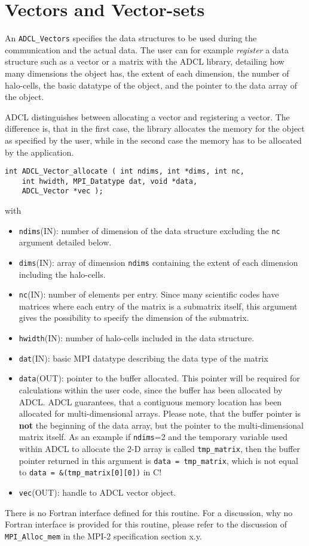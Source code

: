 \section{Vectors and Vector-sets}

An {\tt ADCL\_Vectors} specifies the data structures to be used during the communication and the actual data. The user can for example {\it register} a data structure such as a vector or a matrix with the ADCL library, detailing how many dimensions the object has, the extent of each dimension, the number of halo-cells, the basic datatype of the object, and the pointer to the data array of the object.

ADCL distinguishes between allocating a vector and registering a vector. The difference is, that in the first case, the library allocates the memory for the object as specified by the user, while in the second case the memory has to be allocated by the application. 

\begin{verbatim}
int ADCL_Vector_allocate ( int ndims, int *dims, int nc, 
    int hwidth, MPI_Datatype dat, void *data, 
    ADCL_Vector *vec );
\end{verbatim}
with
\begin{itemize}
\item {\tt ndims}(IN): number of dimension of the data structure excluding the {\tt nc} argument detailed below.
\item {\tt dims}(IN): array of dimension {\tt ndims} containing the extent of each dimension including the halo-cells.
\item {\tt nc}(IN): number of elements per entry. Since many scientific codes have matrices where each entry of the 
	matrix is a submatrix itself, this argument gives the possibility to specify the dimension of the submatrix.
\item {\tt hwidth}(IN): number of halo-cells included in the data structure.
\item {\tt dat}(IN): basic MPI datatype describing the data type of the matrix
\item {\tt data}(OUT): pointer to the buffer allocated. This pointer will be required for calculations within the user code, since the buffer has been allocated by ADCL. ADCL guarantees, that a contiguous memory location has been allocated for multi-dimensional arrays. Please note, that the buffer pointer is {\bf not} the beginning of the data array, but the pointer to the multi-dimensional matrix itself. As an example if {\tt ndims}=2 and the temporary variable used within ADCL to allocate the 2-D array is called {\tt tmp\_matrix}, then the buffer pointer returned in this argument is {\tt data = tmp\_matrix},  which is not equal to {\tt data = \&(tmp\_matrix[0][0])} in C!
\item {\tt vec}(OUT): handle to ADCL vector object.
\end{itemize}
There is no Fortran interface defined for this routine. For a discussion, why no Fortran interface is provided for this routine, please refer to the discussion of {\tt MPI\_Alloc\_mem} in the MPI-2 specification section x.y.

